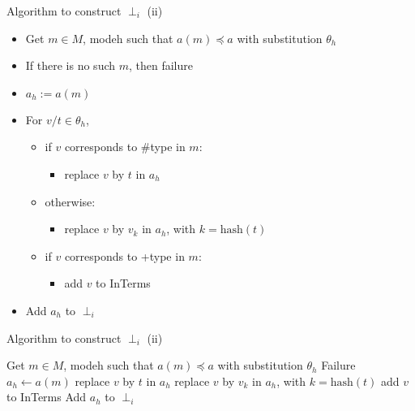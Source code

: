 \begin{frame}{Algorithm to construct $\perp_i$ (ii)}

\begin{itemize}
    \item Get $m \in M$, modeh such that $a(m) \preceq a$ with substitution $\theta_h$
    \item If there is no such $m$, then failure
    \item $a_h := a(m)$
    \item For $v/t \in \theta_h$,
    \begin{itemize}
        \item if $v$ corresponds to \#type in $m$:
        \begin{itemize}
            \item[\ding{43}] replace $v$ by $t$ in $a_h$
        \end{itemize}
        \item otherwise:
        \begin{itemize}
            \item[\ding{43}] replace $v$ by $v_k$ in $a_h$, with $k=\text{hash}(t)$
        \end{itemize}
        \item if $v$ corresponds to +type in $m$:
        \begin{itemize}
            \item[\ding{43}] add $v$ to InTerms
        \end{itemize}
    \end{itemize}
    \item Add $a_h$ to $\perp_i$
\end{itemize}
    
\end{frame}


\begin{frame}{Algorithm to construct $\perp_i$ (ii)}
\begin{algorithm}[H]
\scriptsize
\caption{Construct $\perp_i$ - Part 1}\label{alg:cap}
\begin{algorithmic}[1]
\State Get $m \in M$, modeh such that $a(m) \preceq a$ with substitution $\theta_h$
\State Failure
\EndIf
\State $a_h \gets a(m)$
\State replace $v$ by $t$ in $a_h$
\Else 
\State replace $v$ by $v_k$ in $a_h$, with $k=\text{hash}(t)$
\EndIf
{}
\State add $v$ to InTerms
\EndIf
\EndFor
\State Add $a_h$ to $\perp_i$
\end{algorithmic}
\end{algorithm}    
\end{frame}

